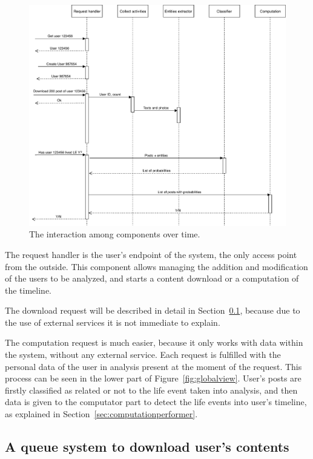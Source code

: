 \begin{figure}
\centering
\includegraphics[width=%
1\textwidth]{img/Interaction}
\caption{The interaction among components over time.}
\label{fig:interaction}
\end{figure}

The request handler is the user's endpoint of the system, the only access point from the outside. This component allows managing the addition and modification of the users to be analyzed, and starts a content download or a computation of the timeline.

The download request will be described in detail in Section~\ref{sec:downloadqueues}, because due to the use of external services it is not immediate to explain.

The computation request is much easier, because it only works with data within the system, without any external service. Each request is fulfilled with the personal data of the user in analysis present at the moment of the request. This process can be seen in the lower part of Figure~\ref{fig:globalview}. User's posts are firstly classified as related or not to the life event taken into analysis, and then data is given to the computator part to detect the life events into user's timeline, as explained in Section~\ref{sec:computationperformer}. 

\subsection{A queue system to download user's contents}
\label{sec:downloadqueues}

